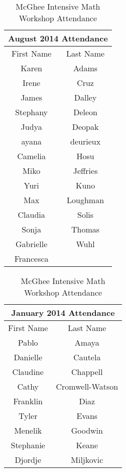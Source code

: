 \documentclass[12pt,dvipsnames]{article}
\begin{document}

        \begin{table}
        	\footnotesize
        	\caption*{McGhee Intensive Math Workshop Attendance}

 	\begin{tabular}{|c|c|}
 		\multicolumn{2}{c}{\bfseries August 2014 Attendance}\\\hline
 		First Name & Last Name\\ 
 		\hline
 		Karen & Adams\\ 
\hline
Irene & Cruz\\ 
\hline
James & Dalley\\ 
\hline
Stephany & Deleon\\ 
\hline
Judya  & Deopak\\ 
\hline
ayana  & deurieux\\ 
\hline
Camelia  & Hosu\\ 
\hline
Miko & Jeffries\\ 
\hline
Yuri & Kuno\\ 
\hline
Max & Loughman\\ 
\hline
Claudia  & Solis\\ 
\hline
Sonja & Thomas\\ 
\hline
Gabrielle  & Wuhl\\ 
\hline
Francesca & \\  
 		\hline\end{tabular}
 \hfill
 	\begin{tabular}{|c|c|}
 	 		\multicolumn{2}{c}{\bfseries January 2014 Attendance}\\\hline
 		First Name & Last Name\\ 
 		\hline
 		Pablo & Amaya\\ 
\hline
Danielle & Cautela\\ 
\hline
Claudine  & Chappell\\ 
\hline
Cathy & Cromwell-Watson\\ 
\hline
Franklin & Diaz\\ 
\hline
Tyler  & Evans\\ 
\hline
Menelik  & Goodwin\\ 
\hline
Stephanie & Keane\\ 
\hline
Djordje & Miljkovic\\ 

\end{tabular}
\end{table}
\end{document}
